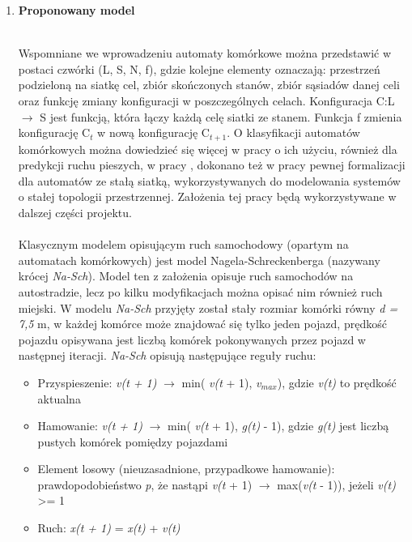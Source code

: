 \documentclass[a4paper,11pt]{article}
\begin{document}
\begin{enumerate}

	\newpage
	\item \textbf{{\Large Proponowany model}}\\ \\
	 \begin{large}
			Wspomniane we wprowadzeniu automaty komórkowe można przedstawić w postaci czwórki (L, S, N, f), gdzie kolejne elementy oznaczają: przestrzeń podzieloną na siatkę cel, zbiór skończonych stanów, zbiór sąsiadów danej celi oraz funkcję zmiany konfiguracji w poszczególnych celach. Konfiguracja C:L $\rightarrow$ S jest funkcją, która łączy każdą celę siatki ze stanem. Funkcja f zmienia konfigurację C$_{t}$ w nową konfigurację C$_{t+1}$. O klasyfikacji automatów komórkowych można dowiedzieć się więcej w pracy \cite{wkasalgorytmy} o ich użyciu, również dla predykcji ruchu pieszych, w pracy \cite{wkas2004zastosowanie}, dokonano też w pracy \cite{dudek2005formalizacja} pewnej formalizacji dla automatów ze stałą siatką, wykorzystywanych do modelowania systemów o stałej topologii przestrzennej. Założenia tej pracy będą wykorzystywane w dalszej części projektu.\\ \\
			 Klasycznym modelem opisującym ruch samochodowy (opartym na automatach komórkowych) jest model Nagela-Schreckenberga \cite{nagel1992cellular} (nazywany krócej \textit{Na-Sch}). Model ten z założenia opisuje ruch samochodów na autostradzie, lecz po kilku modyfikacjach można opisać nim również ruch miejski. W modelu \textit{Na-Sch} przyjęty został stały rozmiar komórki równy \textit{d = 7,5} m, w każdej komórce może znajdować się tylko jeden pojazd, prędkość pojazdu opisywana jest liczbą komórek pokonywanych przez pojazd w następnej iteracji. \textit{Na-Sch} opisują następujące reguły ruchu:
			 \begin{itemize}
				\item Przyspieszenie: \textit{v(t + 1)} $\rightarrow$ min( \textit{v(t} + 1), \textit{v}$_{max}$), gdzie \textit{v(t)}	to prędkość aktualna
				\item Hamowanie: \textit{v(t + 1)} $\rightarrow$ min( \textit{v(t} + 1), \textit{g(t)} - 1), gdzie \textit{g(t)}	jest liczbą pustych komórek pomiędzy pojazdami
				\item Element losowy (nieuzasadnione, przypadkowe hamowanie): prawdopodobieństwo \textit{p}, że nastąpi \textit{v(t} + 1) $\rightarrow$ max(\textit{v(t} - 1)), jeżeli \textit{v(t)} >= 1
				\item Ruch: \textit{x(t + 1)} = \textit{x(t)} + \textit{v(t)}
			 \end{itemize}
			

\end{large}
\end{enumerate}
\end{document}
